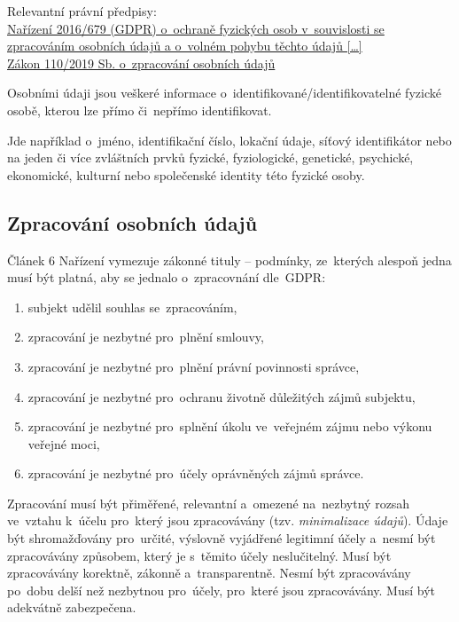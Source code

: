 {}Relevantní právní předpisy:
\\\href{https://eur-lex.europa.eu/legal-content/CS/ALL/?uri=CELEX:32016R0679
}{Nařízení 2016/679 (GDPR) o~ochraně fyzických osob v~souvislosti se zpracováním osobních údajů a o~volném pohybu těchto údajů [\dots]}
\\\href{https://www.zakonyprolidi.cz/cs/2019-110}{Zákon 110/2019 Sb. o~zpracování osobních údajů}

Osobními údaji jsou veškeré informace o~identifikované/identifikovatelné fyzické osobě, kterou lze přímo či~nepřímo identifikovat.

Jde například o~jméno, identifikační číslo, lokační údaje, síťový identifikátor nebo na jeden či více zvláštních prvků fyzické, fyziologické, genetické, psychické, ekonomické, kulturní nebo společenské identity této fyzické osoby.

\subsection{Zpracování osobních údajů}

Článek 6 Nařízení vymezuje zákonné tituly -- podmínky, ze~kterých alespoň jedna musí být platná, aby se jednalo o~zpracovnání dle~GDPR:

\begin{enumerate}[label=\alph*)]
\item subjekt udělil souhlas se~zpracováním,
\item zpracování je nezbytné pro~plnění smlouvy,
\item zpracování je nezbytné pro~plnění právní povinnosti správce,
\item zpracování je nezbytné pro~ochranu životně důležitých zájmů subjektu,
\item zpracování je nezbytné pro~splnění úkolu ve~veřejném zájmu nebo výkonu veřejné moci,
\item zpracování je nezbytné pro~účely oprávněných zájmů správce.
\end{enumerate}

Zpracování musí být přiměřené, relevantní a~omezené na~nezbytný rozsah ve~vztahu k~účelu pro~který jsou zpracovávány (tzv. \emph{minimalizace údajů}).
Údaje být shromažďovány pro~určité, výslovně vyjádřené legitimní účely a~nesmí být zpracovávány způsobem, který je s~těmito účely neslučitelný.
Musí být zpracovávány korektně, zákonně a~transparentně.
Nesmí být zpracovávány po~dobu delší než nezbytnou pro~účely, pro~které jsou zpracovávány.
Musí být adekvátně zabezpečena.

